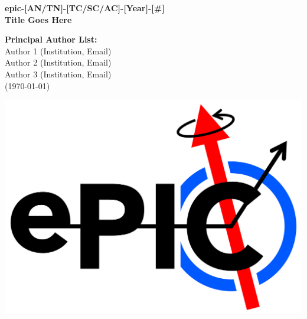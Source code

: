 %
\vspace*{0.1cm}
\begin{center}
{\bf\Large epic-[AN/TN]-[TC/SC/AC]-[Year]-[\#] } \\
\vspace*{1.0cm}
{\bf\Large Title Goes Here} \\
\end{center}
%
\vspace*{0.1cm}
%
\begin{center}
{\bf Principal Author List:} \\ 
\vspace*{0.15cm}
Author 1 (Institution, Email)\\
Author 2 (Institution, Email)\\
Author 3 (Institution, Email)\\
\vspace*{0.5cm}
(\today)
\end{center}



\vfill
\begin{center}
{\includegraphics[width=0.4\linewidth]{2560px-EPIC-logo_black_transparent.png}}
\end{center}
\vfill


\pagebreak
%
\begin{abstract}
\noindent \textit{Abstract for analysis note goes here.}
\end{abstract}
